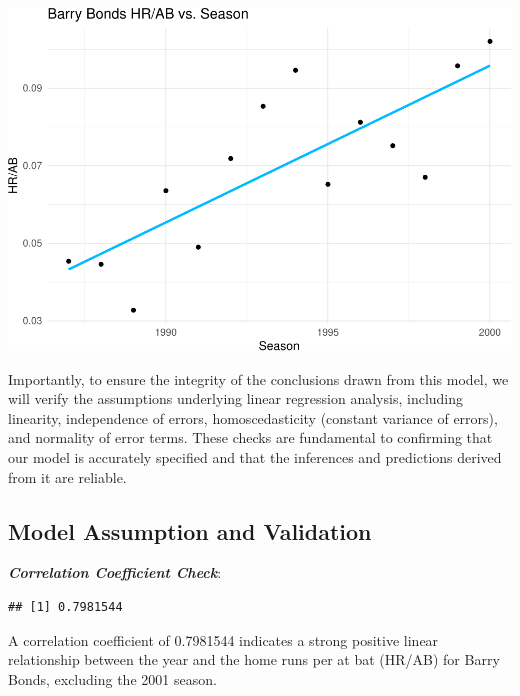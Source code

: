\documentclass[
]{article}
\newenvironment{Shaded}{\begin{snugshade}}{\end{snugshade}}
\newcommand{\FunctionTok}[1]{\textcolor[rgb]{0.13,0.29,0.53}{\textbf{#1}}}
\newcommand{\NormalTok}[1]{#1}
\newcommand{\SpecialCharTok}[1]{\textcolor[rgb]{0.81,0.36,0.00}{\textbf{#1}}}
\begin{document}
\includegraphics{602_project_files/figure-latex/unnamed-chunk-4-1.pdf}

Importantly, to ensure the integrity of the conclusions drawn from this
model, we will verify the assumptions underlying linear regression
analysis, including linearity, independence of errors, homoscedasticity
(constant variance of errors), and normality of error terms. These
checks are fundamental to confirming that our model is accurately
specified and that the inferences and predictions derived from it are
reliable.

\subsection{Model Assumption and
Validation}\label{model-assumption-and-validation}

\textbf{\emph{Correlation Coefficient Check}}:

\begin{Shaded}
\end{Shaded}

\begin{verbatim}
## [1] 0.7981544
\end{verbatim}

A correlation coefficient of 0.7981544 indicates a strong positive
linear relationship between the year and the home runs per at bat
(HR/AB) for Barry Bonds, excluding the 2001 season.
\end{document}

